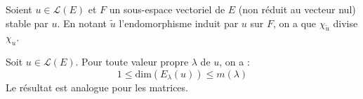 \documentclass[french,11pt,twoside]{VcCours}
\begin{document}
\begin{Proposition}{}\label{stab2} Soient $u \in \mathcal{L}(E)$ et $F$ un sous-espace vectoriel de $E$ (non réduit au vecteur nul) stable par $u$. En notant $\tilde{u}$ l'endomorphisme induit par $u$ sur $F$, on a que $\chi_{\tilde{u}}$ divise $\chi_{u}$.
\end{Proposition} 

\begin{Demonstration}{} 
%

\vspace{7cm}
\end{Demonstration}

\begin{Corollaire}{} Soit $u \in \mathcal{L}(E)$. Pour toute valeur propre $\lambda$ de $u$, on a :
$$ 1 \leq \textrm{dim}(E_{\lambda}(u)) \leq m(\lambda) $$
Le résultat est analogue pour les matrices.
\end{Corollaire}
\end{document}
